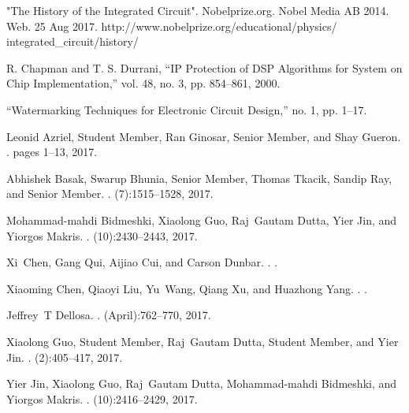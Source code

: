 \documentclass[10pt,journal,compsoc,letterpaper,final]{IEEEtran}
\begin{document}
\begin{thebibliography}{2}

"The History of the Integrated Circuit". Nobelprize.org. Nobel Media AB 2014. Web. 25 Aug 2017. http://www.nobelprize.org/educational/physics/\\integrated\_circuit/history/

R. Chapman and T. S. Durrani, “IP Protection of DSP Algorithms for System on Chip Implementation,” vol. 48, no. 3, pp. 854–861, 2000.

“Watermarking Techniques for Electronic Circuit Design,” no. 1, pp. 1–17.

Leonid Azriel, Student Member, Ran Ginosar, Senior Member, and Shay Gueron.
.
\newblock pages 1--13, 2017.

Abhishek Basak, Swarup Bhunia, Senior Member, Thomas Tkacik, Sandip Ray, and
Senior Member.
.
(7):1515--1528, 2017.

Mohammad-mahdi Bidmeshki, Xiaolong Guo, Raj~Gautam Dutta, Yier Jin, and Yiorgos
Makris.
.
(10):2430--2443, 2017.

Xi~Chen, Gang Qui, Aijiao Cui, and Carson Dunbar.
.
.

Xiaoming Chen, Qiaoyi Liu, Yu~Wang, Qiang Xu, and Huazhong Yang.
.
.

Jeffrey~T Dellosa.
.
\newblock (April):762--770, 2017.

Xiaolong Guo, Student Member, Raj~Gautam Dutta, Student Member, and Yier Jin.
.
(2):405--417, 2017.

Yier Jin, Xiaolong Guo, Raj~Gautam Dutta, Mohammad-mahdi Bidmeshki, and Yiorgos
Makris.
.
(10):2416--2429, 2017.


\end{thebibliography}
\end{document}
